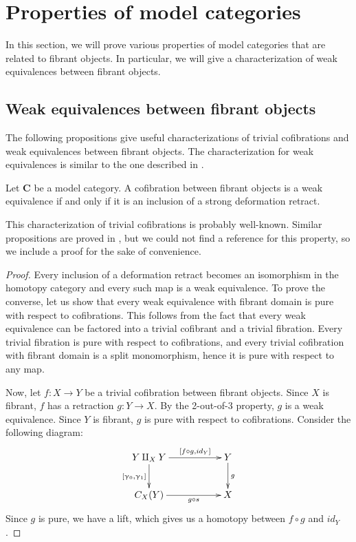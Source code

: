 \documentclass{tac}
\theoremstyle{definition}
\newcommand{\cat}[1]{\mathbf{#1}}
\newcommand{\C}{\cat{C}}
\newcommand{\cyli}{\upgamma}
\begin{document}
\section{Properties of model categories}

In this section, we will prove various properties of model categories that are related to fibrant objects.
In particular, we will give a characterization of weak equivalences between fibrant objects.

\subsection{Weak equivalences between fibrant objects}

The following propositions give useful characterizations of trivial
cofibrations and weak equivalences between fibrant objects.
The characterization for weak equivalences is similar to the one described in \cite{vogt-we}.

\begin{prop}
Let $\C$ be a model category.
A cofibration between fibrant objects is a weak equivalence if and only if it is an inclusion of a strong deformation retract.
\end{prop}

This characterization of trivial cofibrations is probably well-known.
Similar propositions are proved in \cite{hirschhorn}, but we could not find a reference for this property, so we include a proof for the sake of convenience.

\begin{proof}
Every inclusion of a deformation retract becomes an isomorphism in the homotopy category and every such map is a weak equivalence.
To prove the converse, let us show that every weak equivalence with fibrant domain is pure with respect to cofibrations.
This follows from the fact that every weak equivalence can be factored into a trivial cofibrant and a trivial fibration.
Every trivial fibration is pure with respect to cofibrations, and every trivial cofibration with fibrant domain is a split monomorphism,
hence it is pure with respect to any map.

Now, let $f : X \to Y$ be a trivial cofibration between fibrant objects.
Since $X$ is fibrant, $f$ has a retraction $g : Y \to X$.
By the 2-out-of-3 property, $g$ is a weak equivalence.
Since $Y$ is fibrant, $g$ is pure with respect to cofibrations.
Consider the following diagram:
\[ \xymatrix{ Y \amalg_X Y \ar[rr]^-{[f \circ g, id_Y]} \ar[d]_{[\cyli_0,\cyli_1]} & & Y \ar[d]^g \\
              C_X(Y) \ar[rr]_-{g \circ s} & & X
            } \]
Since $g$ is pure, we have a lift, which gives us a homotopy between $f \circ g$ and $id_Y$.
\end{proof}
\end{document}

